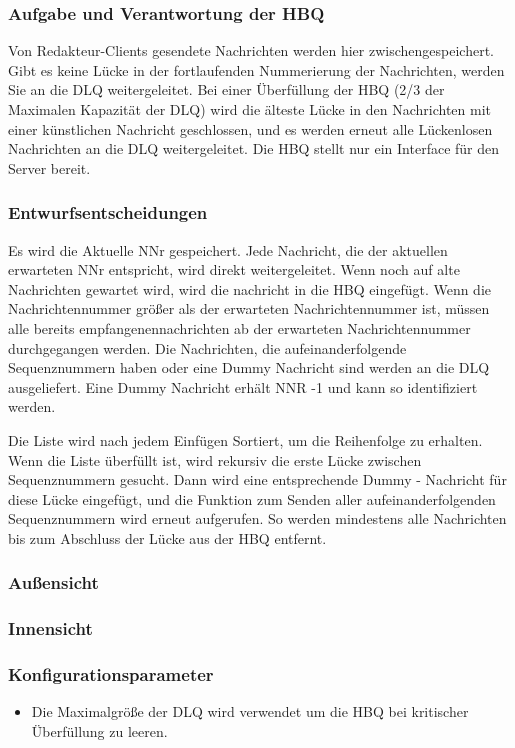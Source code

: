\documentclass{article}
\begin{document}
\subsubsection{Aufgabe und Verantwortung der HBQ}
Von Redakteur-Clients gesendete Nachrichten werden hier zwischengespeichert. Gibt es keine Lücke in der fortlaufenden Nummerierung der Nachrichten, werden Sie an die DLQ weitergeleitet. Bei einer Überfüllung der HBQ (2/3 der Maximalen Kapazität der DLQ) wird die älteste Lücke in den Nachrichten mit einer künstlichen Nachricht geschlossen, und es werden erneut alle Lückenlosen Nachrichten an die DLQ weitergeleitet. Die HBQ stellt nur ein Interface für den Server bereit.

\subsubsection{Entwurfsentscheidungen}
Es wird die Aktuelle NNr gespeichert.
Jede Nachricht, die der aktuellen erwarteten NNr entspricht, wird direkt weitergeleitet.
Wenn noch auf alte Nachrichten gewartet wird, wird die nachricht in die HBQ eingefügt.
Wenn die Nachrichtennummer größer als der erwarteten Nachrichtennummer ist,
müssen alle bereits empfangenennachrichten ab der erwarteten Nachrichtennummer durchgegangen werden.
Die Nachrichten, die aufeinanderfolgende Sequenznummern haben oder eine Dummy Nachricht sind werden an die
DLQ ausgeliefert. Eine Dummy Nachricht erhält NNR -1 und kann so identifiziert werden.

Die Liste wird nach jedem Einfügen Sortiert, um die Reihenfolge zu erhalten. Wenn die Liste überfüllt ist,
wird rekursiv die erste Lücke zwischen Sequenznummern gesucht. Dann wird eine entsprechende 
Dummy - Nachricht für diese Lücke eingefügt, und die Funktion zum Senden aller aufeinanderfolgenden Sequenznummern wird erneut aufgerufen.
So werden mindestens alle Nachrichten bis zum Abschluss der Lücke aus der HBQ entfernt.

				
\subsubsection{Außensicht}

\subsubsection{Innensicht}

\subsubsection{Konfigurationsparameter}
\begin{itemize}
	\item Die Maximalgröße der DLQ wird verwendet um die HBQ bei kritischer Überfüllung zu leeren.
\end{itemize}
\newpage
\end{document}
